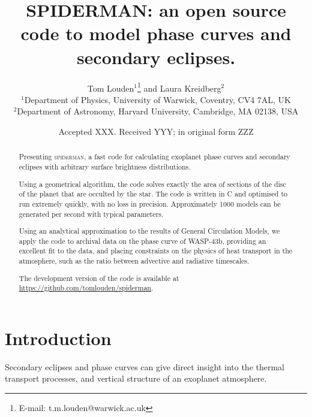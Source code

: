 \documentclass[a4paper,fleqn,usenatbib]{mnras}
\title[SPIDERMAN]{SPIDERMAN: an open source code to model phase curves and secondary eclipses.}
\author[T. Louden, L. Kreidberg]{Tom Louden$^{1}$\thanks{E-mail: t.m.louden@warwick.ac.uk} and Laura Kreidberg$^{2}$\\
$^{1}$Department of Physics, University of Warwick, Coventry, CV4 7AL, UK\\
$^{2}$Department of Astronomy, Harvard University, Cambridge, MA 02138, USA}
\date{Accepted XXX. Received YYY; in original form ZZZ}
\begin{document}
\label{firstpage}
\pagerange{\pageref{firstpage}--\pageref{lastpage}}
\maketitle

\begin{abstract}

Presenting \textsc{spiderman}, a fast code for calculating exoplanet phase curves and secondary eclipses with arbitrary surface brightness distributions.

Using a geometrical algorithm, the code solves exactly the area of sections of the disc of the planet that are occulted by the star. The code is written in C and optimised to run extremely quickly, with no loss in precision. Approximately 1000 models can be generated per second with typical parameters.

Using an analytical approximation to the results of General Circulation Models, we apply the code to archival data on the phase curve of WASP-43b, providing an excellent fit to the data, and placing constraints on the physics of heat transport in the atmosphere, such as the ratio between advective and radiative timescales.

The development version of the code is available at \url{https://github.com/tomlouden/spiderman}.

\end{abstract}

\begin{keywords}
\end{keywords}



\section{Introduction}\label{sec:introduction}

Secondary eclipses and phase curves can give direct insight into the thermal transport processes, and vertical structure of an exoplanet atmosphere.
\end{document}
